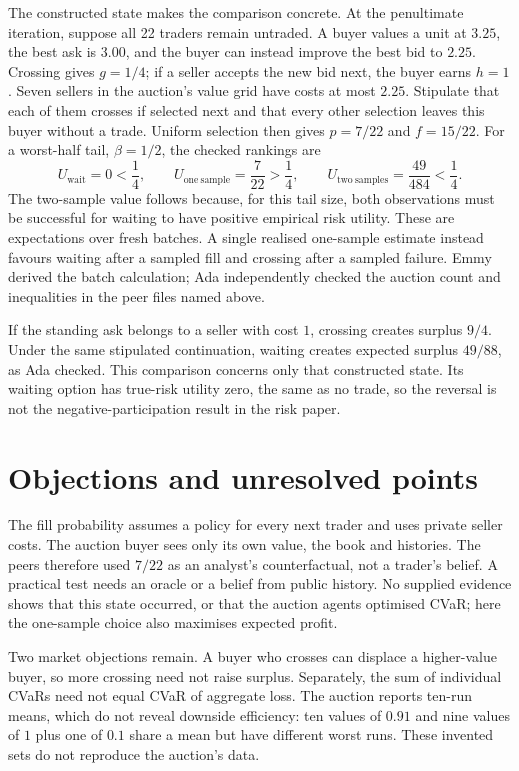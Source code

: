 \documentclass{article}
\begin{document}
The constructed state makes the comparison concrete. At the penultimate iteration, suppose all 22
traders remain untraded. A buyer values a unit at \(3.25\), the best ask is \(3.00\), and the buyer
can instead improve the best bid to \(2.25\). Crossing gives \(g=1/4\); if a seller accepts the new
bid next, the buyer earns \(h=1\). Seven sellers in the auction's value grid have costs at most
\(2.25\). Stipulate that each of them crosses if selected next and that every other selection leaves
this buyer without a trade. Uniform selection then gives \(p=7/22\) and \(f=15/22\). For a
worst-half tail, \(\beta=1/2\), the checked rankings are
\[
U_{\mathrm{wait}}=0<\frac14,
\qquad U_{\mathrm{one\ sample}}=\frac7{22}>\frac14,
\qquad U_{\mathrm{two\ samples}}=\frac{49}{484}<\frac14.
\]
The two-sample value follows because, for this tail size, both observations must be successful for
waiting to have positive empirical risk utility. These are expectations over fresh batches. A single
realised one-sample estimate instead favours waiting after a sampled fill and crossing after a
sampled failure. Emmy derived the batch calculation; Ada independently checked the auction count and
inequalities in the peer files named above.

If the standing ask belongs to a seller with cost \(1\), crossing creates surplus \(9/4\). Under the
same stipulated continuation, waiting creates expected surplus \(49/88\), as Ada checked. This
comparison concerns only that constructed state. Its waiting option has true-risk utility zero, the
same as no trade, so the reversal is not the negative-participation result in the risk paper.

\section{Objections and unresolved points}

The fill probability assumes a policy for every next trader and uses private seller costs. The
auction buyer sees only its own value, the book and histories. The peers therefore used \(7/22\) as
an analyst's counterfactual, not a trader's belief. A practical test needs an oracle or a belief
from public history. No supplied evidence shows that this state occurred, or that the auction agents
optimised CVaR; here the one-sample choice also maximises expected profit.

Two market objections remain. A buyer who crosses can displace a higher-value buyer, so more
crossing need not raise surplus. Separately, the sum of individual CVaRs need not equal CVaR of
aggregate loss. The auction reports ten-run means, which do not reveal downside efficiency: ten
values of \(0.91\) and nine values of \(1\) plus one of \(0.1\) share a mean but have different
worst runs. These invented sets do not reproduce the auction's data.
\end{document}
